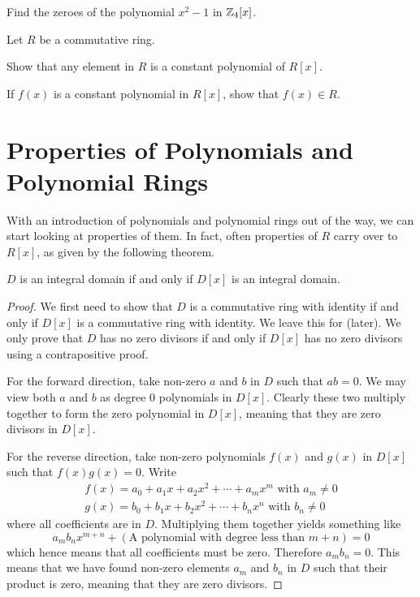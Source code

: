 \begin{exercise}
    Find the zeroes of the polynomial $x^2-1$ in $\mathbb{Z}_4[x]$.
\end{exercise}
\begin{exercise}\label{exercise-constant-polynomial-iff-ring-element}
    Let $R$ be a commutative ring.
    \begin{partquestions}{\alph*}
        \item Show that any element in $R$ is a constant polynomial of $R[x]$.
        \item If $f(x)$ is a constant polynomial in $R[x]$, show that $f(x) \in R$.
    \end{partquestions}
\end{exercise}

\newpage

\section{Properties of Polynomials and Polynomial Rings}
With an introduction of polynomials and polynomial rings out of the way, we can start looking at properties of them. In fact, often properties of $R$ carry over to $R[x]$, as given by the following theorem.

\begin{theorem}\label{thrm-integral-domain-iff-polynomial-ring-is-integral-domain}
    $D$ is an integral domain if and only if $D[x]$ is an integral domain.
\end{theorem}
\begin{proof}
    We first need to show that $D$ is a commutative ring with identity if and only if $D[x]$ is a commutative ring with identity. We leave this for  (later). We only prove that $D$ has no zero divisors if and only if $D[x]$ has no zero divisors using a contrapositive proof.

    For the forward direction, take non-zero $a$ and $b$ in $D$ such that $ab = 0$. We may view both $a$ and $b$ as degree 0 polynomials in $D[x]$. Clearly these two multiply together to form the zero polynomial in $D[x]$, meaning that they are zero divisors in $D[x]$.

    For the reverse direction, take non-zero polynomials $f(x)$ and $g(x)$ in $D[x]$ such that $f(x)g(x) = 0$. Write
    \begin{align*}
        f(x) = a_0+a_1x+a_2x^2+\cdots+a_mx^m \text{ with } a_m \neq 0\\
        g(x) = b_0+b_1x+b_2x^2+\cdots+b_nx^n \text{ with } b_n \neq 0
    \end{align*}
    where all coefficients are in $D$. Multiplying them together yields something like
    \[
        a_mb_nx^{m+n} + (\text{A polynomial with degree less than }m+n) = 0
    \]
    which hence means that all coefficients must be zero. Therefore $a_mb_n = 0$. This means that we have found non-zero elements $a_m$ and $b_n$ in $D$ such that their product is zero, meaning that they are zero divisors.
\end{proof}

